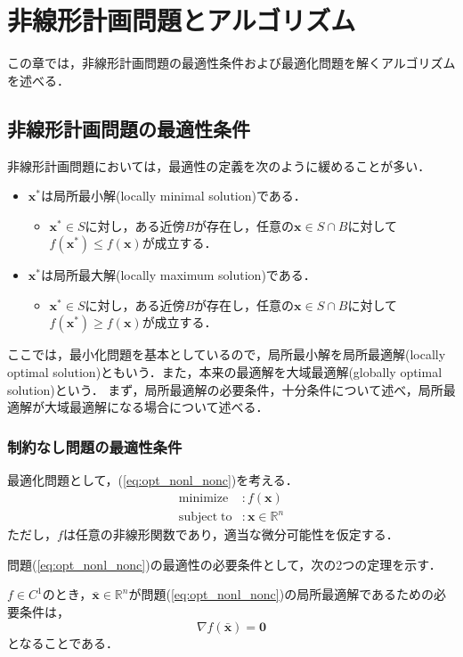 \documentclass{jsreport}
\begin{document}
\chapter{非線形計画問題とアルゴリズム}
この章では，非線形計画問題の最適性条件および最適化問題を解くアルゴリズムを述べる．
\section{非線形計画問題の最適性条件}
非線形計画問題においては，最適性の定義を次のように緩めることが多い．
\begin{itemize}
  \item $\bm{x}^*$は局所最小解(locally minimal solution)である．
  \begin{itemize}
    \item $\bm{x}^* \in S$に対し，ある近傍$B$が存在し，任意の$\bm{x} \in S \cap B$に対して$f(\bm{x}^*) \leq f(\bm{x})$が成立する．
  \end{itemize}
  \item $\bm{x}^*$は局所最大解(locally maximum solution)である．
  \begin{itemize}
    \item $\bm{x}^* \in S$に対し，ある近傍$B$が存在し，任意の$\bm{x} \in S \cap B$に対して$f(\bm{x}^*) \geq f(\bm{x})$が成立する．
  \end{itemize}
\end{itemize}

ここでは，最小化問題を基本としているので，局所最小解を局所最適解(locally optimal solution)ともいう．また，本来の最適解を大域最適解(globally optimal solution)という．
まず，局所最適解の必要条件，十分条件について述べ，局所最適解が大域最適解になる場合について述べる．

\subsection{制約なし問題の最適性条件}
最適化問題として，(\ref{eq:opt_nonl_nonc})を考える．
\begin{align}\label{eq:opt_nonl_nonc}
  \mathrm{minimize} &: f(\bm{x}) \nonumber\\
  \mathrm{subject \; to} &: \bm{x} \in \mathbb{R}^n
\end{align}
ただし，$f$は任意の非線形関数であり，適当な微分可能性を仮定する．

問題(\ref{eq:opt_nonl_nonc})の最適性の必要条件として，次の2つの定理を示す．
\begin{theo}\label{theo:opt_nonl_nonc_h_1}
  $f \in C^{1}$のとき，$\bar{\bm{x}} \in \mathbb{R}^n$が問題(\ref{eq:opt_nonl_nonc})の局所最適解であるための必要条件は，
  \begin{equation}
    \nabla f(\bar{\bm{x}}) = \bm{0} \nonumber
  \end{equation}
  となることである．
\end{theo}
\end{document}
